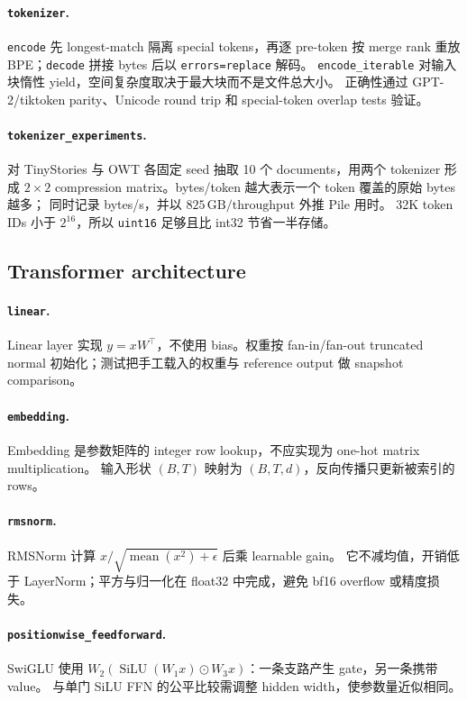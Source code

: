 \paragraph{\texttt{tokenizer}.}
\texttt{encode} 先 longest-match 隔离 special tokens，再逐 pre-token 按 merge rank
重放 BPE；\texttt{decode} 拼接 bytes 后以 \texttt{errors=replace} 解码。
\texttt{encode\_iterable} 对输入块惰性 yield，空间复杂度取决于最大块而不是文件总大小。
正确性通过 GPT-2/tiktoken parity、Unicode round trip 和 special-token overlap tests 验证。

\paragraph{\texttt{tokenizer\_experiments}.}
对 TinyStories 与 OWT 各固定 seed 抽取 10 个 documents，用两个 tokenizer 形成
$2\times2$ compression matrix。bytes/token 越大表示一个 token 覆盖的原始 bytes 越多；
同时记录 bytes/s，并以 $825\,\mathrm{GB}/\mathrm{throughput}$ 外推 Pile 用时。
32K token IDs 小于 $2^{16}$，所以 \texttt{uint16} 足够且比 int32 节省一半存储。

\subsection{Transformer architecture}
\paragraph{\texttt{linear}.}
Linear layer 实现 $y=xW^\top$，不使用 bias。权重按 fan-in/fan-out truncated normal
初始化；测试把手工载入的权重与 reference output 做 snapshot comparison。

\paragraph{\texttt{embedding}.}
Embedding 是参数矩阵的 integer row lookup，不应实现为 one-hot matrix multiplication。
输入形状 $(B,T)$ 映射为 $(B,T,d)$，反向传播只更新被索引的 rows。

\paragraph{\texttt{rmsnorm}.}
RMSNorm 计算 $x/\sqrt{\operatorname{mean}(x^2)+\epsilon}$ 后乘 learnable gain。
它不减均值，开销低于 LayerNorm；平方与归一化在 float32 中完成，避免 bf16 overflow
或精度损失。

\paragraph{\texttt{positionwise\_feedforward}.}
SwiGLU 使用
$W_2(\operatorname{SiLU}(W_1x)\odot W_3x)$：一条支路产生 gate，另一条携带 value。
与单门 SiLU FFN 的公平比较需调整 hidden width，使参数量近似相同。

